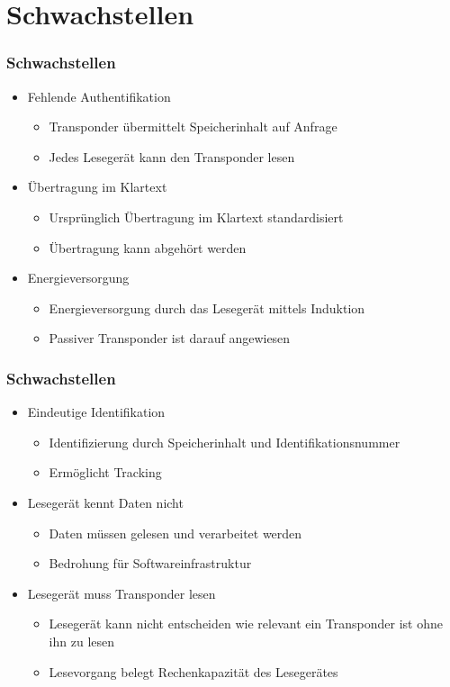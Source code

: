 \documentclass{beamer}
\begin{document}
\section{Schwachstellen}
\begin{frame}
\frametitle{Schwachstellen}

\begin{itemize}
	\item Fehlende Authentifikation
	\begin{itemize}
		\item Transponder übermittelt Speicherinhalt auf Anfrage
		\item Jedes Lesegerät kann den Transponder lesen
	\end{itemize}
	
	\item Übertragung im Klartext
	\begin{itemize}
		\item Ursprünglich Übertragung im Klartext standardisiert
		\item Übertragung kann abgehört werden
	\end{itemize}
	
	\item Energieversorgung
	\begin{itemize}
		\item Energieversorgung durch das Lesegerät mittels Induktion
		\item Passiver Transponder ist darauf angewiesen
	\end{itemize}
\end{itemize}
\end{frame}


\begin{frame}
\frametitle{Schwachstellen}

\begin{itemize}
	\item Eindeutige Identifikation
	\begin{itemize}
		\item Identifizierung durch Speicherinhalt und Identifikationsnummer
		\item Ermöglicht Tracking
	\end{itemize}
	
	\item Lesegerät kennt Daten nicht
	\begin{itemize}
		\item Daten müssen gelesen und verarbeitet werden
		\item Bedrohung für Softwareinfrastruktur
	\end{itemize}
	
	\item Lesegerät muss Transponder lesen
	\begin{itemize}
		\item Lesegerät kann nicht entscheiden wie relevant ein Transponder ist ohne ihn zu lesen
		\item Lesevorgang belegt Rechenkapazität des Lesegerätes
	\end{itemize}
\end{itemize}
\end{frame}
\end{document}
